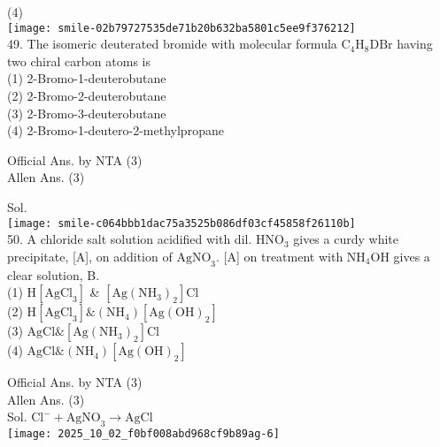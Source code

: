 \documentclass[10pt]{article}
\begin{document}
(4)\\
\texttt{[image: smile-02b79727535de71b20b632ba5801c5ee9f376212]}\\
49. The isomeric deuterated bromide with molecular formula \(\mathrm{C}_{4} \mathrm{H}_{8} \mathrm{DBr}\) having two chiral carbon atoms is\\
(1) 2-Bromo-1-deuterobutane\\
(2) 2-Bromo-2-deuterobutane\\
(3) 2-Bromo-3-deuterobutane\\
(4) 2-Bromo-1-deutero-2-methylpropane

Official Ans. by NTA (3)\\
Allen Ans. (3)

Sol.\\
\texttt{[image: smile-c064bbb1dac75a3525b086df03cf45858f26110b]}\\
50. A chloride salt solution acidified with dil. \(\mathrm{HNO}_{3}\) gives a curdy white precipitate, [A], on addition of \(\mathrm{AgNO}_{3}\). [A] on treatment with \(\mathrm{NH}_{4} \mathrm{OH}\) gives a clear solution, B.\\
(1) \(\mathrm{H}\left[\mathrm{AgCl}_{3}\right]\) \& \(\left[\mathrm{Ag}\left(\mathrm{NH}_{3}\right)_{2}\right] \mathrm{Cl}\)\\
(2) \(\mathrm{H}\left[\mathrm{AgCl}_{3}\right] \&\left(\mathrm{NH}_{4}\right)\left[\mathrm{Ag}(\mathrm{OH})_{2}\right]\)\\
(3) \(\mathrm{AgCl} \&\left[\mathrm{Ag}\left(\mathrm{NH}_{3}\right)_{2}\right] \mathrm{Cl}\)\\
(4) \(\mathrm{AgCl} \&\left(\mathrm{NH}_{4}\right)\left[\mathrm{Ag}(\mathrm{OH})_{2}\right]\)

Official Ans. by NTA (3)\\
Allen Ans. (3)\\
Sol. \(\mathrm{Cl}^{-}+\mathrm{AgNO}_{3} \longrightarrow \mathrm{AgCl}\)\\
\texttt{[image: 2025\_10\_02\_f0bf008abd968cf9b89ag-6]}
\end{document}
